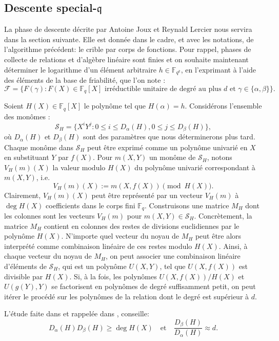 \documentclass[a4paper, titlepage, 11pt]{article}
\theoremstyle{definition}
\theoremstyle{remark}
\def\gf #1{\mathbb{F}_{#1}}
\begin{document}
\subsection{Descente special-$\mathfrak{q}$}\label{s-sec:special-q}

La phase de descente décrite par Antoine Joux et Reynald Lercier \cite{joux2006, joux2002} nous servira dans la section suivante. Elle est donnée dans le cadre, et avec les notations, de l'algorithme précédent: le crible par corps de fonctions. Pour rappel, phases de collecte de relations et d'algèbre linéaire sont finies et on souhaite maintenant déterminer le logarithme d'un élément arbitraire $h\in\gf{q^k}$, en l'exprimant à l'aide des éléments de la base de friabilité, que l'on note :
$$\mathcal{F} =  \{F(\gamma) : F(X) \in \gf{q}[X] \text{ irréductible unitaire de degré au plus } d \text{ et } \gamma \in \{\alpha, \beta\}\}.$$

Soient $H(X)\in\gf{q}[X]$ le polynôme tel que $H(\alpha) = h$. Considérons l'ensemble des monômes :
$$\mathcal S_H = \{X^iY^j : 0 \leqslant i \leqslant D_\alpha(H), 0 \leqslant j \leqslant D_\beta(H)\},$$
où $D_\alpha(H)$ et $D_\beta(H)$ sont des paramètres que nous déterminerons plus tard. Chaque monôme dans $\mathcal S_H$ peut être exprimé comme un polynôme univarié en $X$ en substituant $Y$ par $f(X)$. Pour $m(X,Y)$ un monôme de $\mathcal S_H$, notons $V_H(m)(X)$ la valeur modulo $H(X)$ du polynôme univarié correspondant à $m(X,Y)$, i.e.
$$V_H(m)(X) := m(X,f(X)) \pmod{H(X)}.$$
Clairement, $V_H(m)(X)$ peut être représenté par un vecteur $V_H(m)$ à $\deg H(X)$ coefficients dans le corps fini $\gf{q}$. Construisons une matrice $M_H$ dont les colonnes sont les vecteurs $V_H(m)$ pour $m(X,Y) \in \mathcal S_H$. Concrètement, la matrice $M_H$ contient en colonnes des restes de divisions euclidiennes par le polynôme $H(X)$. N'importe quel vecteur du noyau de $M_H$ peut être alors interprété comme combinaison linéaire de ces restes modulo $H(X)$. Ainsi, à chaque vecteur du noyau de $M_H$, on peut associer une combinaison linéaire d'éléments de $\mathcal S_H$, qui est un polynôme $U(X,Y)$, tel que $U(X,f(X))$ est divisible par $H(X)$. Si, à la fois, les polynômes $U(X,f(X))/H(X)$ et $U(g(Y),Y)$ se factorisent en polynômes de degré suffisamment petit, on peut itérer le procédé sur les polynômes de la relation dont le degré est supérieur à $d$.

L'étude faite dans \cite{joux2006, joux2002} et rappelée dans \cite{joux2013}, conseille:
$$D_\alpha(H) D_\beta(H) \geqslant \deg H(X) \quad\text{et}\quad \frac{D_\beta(H)}{D_\alpha(H)} \approx d.$$
\end{document}
